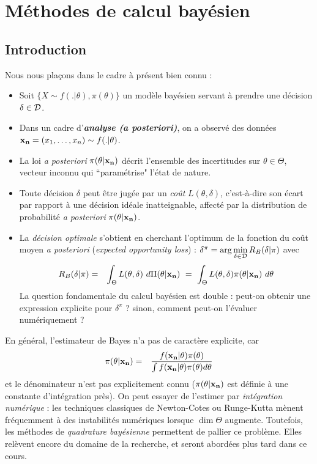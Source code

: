 \section{Méthodes de calcul bayésien}\label{calcul}

\subsection{Introduction}

Nous nous pla\c cons  dans le cadre à présent bien connu :
\begin{itemize}
\item Soit $\{X\sim f(.|\theta),\pi(\theta)\}$ un modèle bayésien servant à prendre une décision $\delta\in{\cal{D}}$. 
\item Dans un cadre d'\emph{\bf analyse ({\it a posteriori})}, on a observé des données ${\bf x_n}=(x_1,\ldots,x_n)\sim f(.|\theta)$.
\item La loi {\it a posteriori} $\pi(\theta|{\bf x_n})$ décrit l'ensemble des incertitudes sur $\theta\in\Theta$, vecteur inconnu qui ``paramétrise" l'état de nature.
\item Toute décision $\delta$ peut être jugée par un \emph{co\^ut} $L(\theta,\delta)$, c'est-à-dire son écart par rapport à une décision idéale inatteignable, affecté par la distribution de probabilité {\it a posteriori} $\pi(\theta|{\bf x_n})$.
\item La \emph{décision optimale} s'obtient en cherchant l'optimum de la fonction du co\^ut moyen {\it a posteriori} ({\it \emph{expected opportunity loss}}) : 
$\delta^{\pi}  =  \arg\min\limits_{\delta\in{\cal{D}}} R_B(\delta|\pi)$ avec
\begin{eqnarray*}
R_B(\delta|\pi) & = & \int_{\Theta} L(\theta,\delta) \ d\Pi(\theta|{\bf x_n}) \ = \ \int_{\Theta} L(\theta,\delta) \pi(\theta|{\bf x_n}) \ d\theta
\end{eqnarray*}
La question fondamentale du calcul bayésien est double : peut-on obtenir une expression explicite pour $\delta^{\pi}$ ? sinon, comment peut-on l'évaluer numériquement ? 
\end{itemize}

En général, l'estimateur de Bayes n'a pas de caractère explicite, car
\begin{eqnarray*}
\pi(\theta|{\bf x_n}) & = & \frac{f({\bf x_n}|\theta) \pi(\theta)}{\int f({\bf x_n}|\theta) \pi(\theta)d\theta }
\end{eqnarray*}
et le dénominateur n'est pas explicitement connu ($\pi(\theta|{\bf x_n})$ est définie à une constante d'intégration près). On peut essayer de l'estimer par \emph{intégration numérique} : les techniques classiques de Newton-Cotes ou Runge-Kutta mènent fréquemment à des instabilités numériques lorsque $\dim\Theta$ augmente. Toutefois, les méthodes de \emph{quadrature bayésienne} permettent de pallier ce problème. Elles relèvent encore du domaine de la recherche, et seront abordées plus tard dans ce cours.  \\

